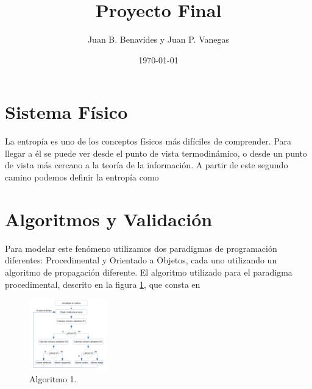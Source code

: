 \documentclass[12pt,twocolumn]{article}
\title{Proyecto Final}
\author{Juan B. Benavides y Juan P. Vanegas }
\date{\today}
\begin{document}
\maketitle

\section{\label{sec: Intro} Sistema Físico}
La entropía es uno de los conceptos físicos más difíciles de comprender. Para llegar a 
él se puede ver desde el punto de vista termodinámico, o desde un punto de vista más 
cercano a la teoría de la información. A partir de este segundo camino podemos definir la 
entropía como 

\section{Algoritmos y Validación}

Para modelar este fenómeno utilizamos dos paradigmas de programación diferentes: Procedimental 
y Orientado a Objetos, cada uno utilizando un algoritmo de propagación diferente. El 
algoritmo utilizado para el paradigma procedimental, descrito en la figura 
\ref{fig:algoritmo_Proc}, que consta en 

\begin{figure}
    \centering
    \includegraphics[width=0.3\textwidth]{figs/Algoritmo_Proc.png}
    \caption{Algoritmo 1.}
    \label{fig:algoritmo_Proc}
\end{figure}
\end{document}
